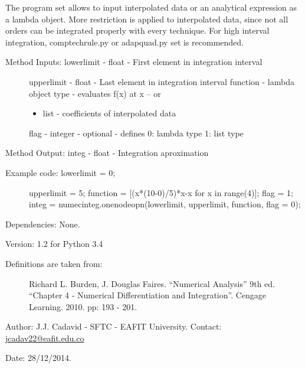\documentclass[letterpaper,10pt,oneside]{sphinxmanual}
\theoremstyle{plain}%
\theoremstyle{definition}%
\theoremstyle{remark}%
\begin{document}
The program set allows to input interpolated data or an analytical expression
as a lambda object. More restriction is applied to interpolated data, since
not all orders can be integrated properly with every technique. For high 
interval integration, comptechrule.py or adapquad.py set is recommended.
\begin{description}
\item[{Method Inputs: lowerlimit - float - First element in integration interval}] \leavevmode
upperlimit - float - Last element in integration interval
function - lambda object type - evaluates f(x) at x -- or
\begin{itemize}
\item {} 
list - coefficients of interpolated data

\end{itemize}

flag - integer - optional - defines 0: lambda type 1: list type

\end{description}

Method Output: integ - float - Integration aproximation
\begin{description}
\item[{Example code: lowerlimit = 0;}] \leavevmode
upperlimit = 5;
function = {[}(x*(10-0)/5)*x-x for x in range(4){]};
flag = 1;
integ =                   numecinteg.onenodeopn(lowerlimit, upperlimit, function, flag = 0);

\end{description}

Dependencies: None.

Version: 1.2 for Python 3.4
\begin{description}
\item[{Definitions are taken from:}] \leavevmode
Richard L. Burden, J. Douglas Faires. ``Numerical Analysis'' 9th ed.
``Chapter 4 - Numerical Differentiation and Integration''. 
Cengage Learning. 2010. pp: 193 - 201.

\end{description}

Author: J.J. Cadavid - SFTC - EAFIT University.
Contact: \href{mailto:jcadav22@eafit.edu.co}{jcadav22@eafit.edu.co}

Date: 28/12/2014.
\end{document}
